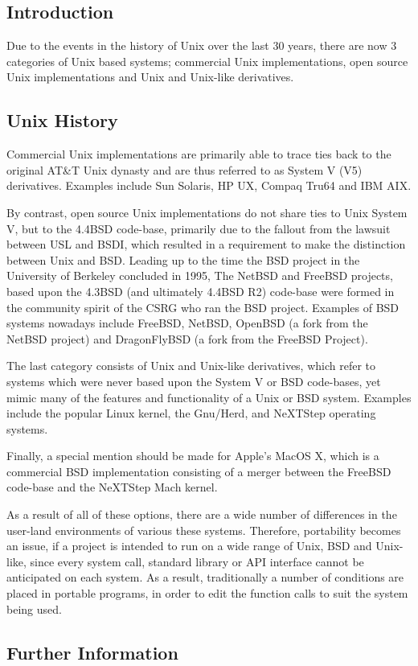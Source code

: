 
\subsection{Introduction}

Due to the events in the history of Unix over the last 30 years, there
are now 3 categories of Unix based systems; commercial Unix
implementations, open source Unix implementations and Unix and Unix-like 
derivatives.

\subsection{Unix History}

Commercial Unix implementations are primarily able to trace ties back to
the original AT\&T Unix dynasty and are thus referred to as System V (V5)
derivatives. Examples include Sun Solaris, HP UX, Compaq
Tru64 and IBM AIX. 


By contrast, open source Unix implementations do not share ties to Unix 
System V, but to the 4.4BSD code-base, primarily due to the fallout from 
the lawsuit between USL and BSDI, which resulted in a requirement to
make the distinction between Unix and BSD. Leading up to the time the 
BSD project in the University of Berkeley concluded in 1995, The NetBSD
and FreeBSD projects, based upon the 4.3BSD (and ultimately 4.4BSD R2) 
code-base were formed in the community spirit of the CSRG who ran the BSD
project. Examples of BSD systems nowadays include FreeBSD, NetBSD,
OpenBSD (a fork from the NetBSD project) and DragonFlyBSD (a fork from
the FreeBSD Project).


The last category consists of Unix and Unix-like derivatives, which
refer to systems which were never based upon the System V or BSD
code-bases, yet mimic many of the features and functionality of a Unix or
BSD system. Examples include the popular Linux kernel, the Gnu/Herd,
and NeXTStep operating systems.


Finally, a special mention should be made for Apple's MacOS X, which is
a commercial BSD implementation consisting of a merger between the
FreeBSD code-base and the NeXTStep Mach kernel.


As a result of all of these options, there are a wide number of
differences in the user-land environments of various these systems.
Therefore, portability becomes an issue, if a project is intended to run
on a wide range of Unix, BSD and Unix-like, since every system call, 
standard library or API interface cannot be anticipated on each system.
As a result, traditionally a number of conditions are placed in portable
programs, in order to edit the function calls to suit the system being
used.

\subsection{Further Information}



